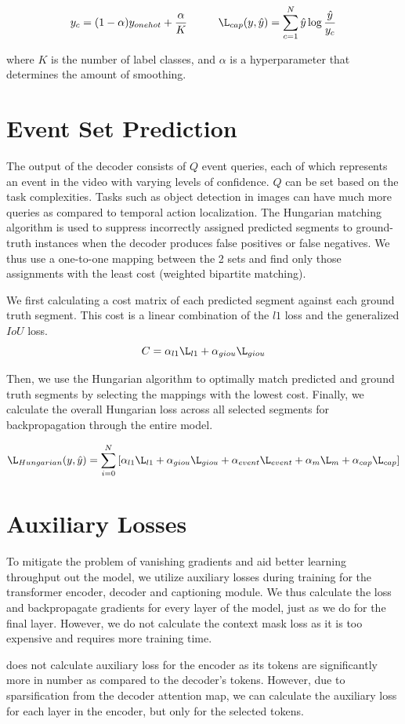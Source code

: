 $$y _{c}= (1 - \alpha)y_{onehot} + \frac{\alpha}{K} \hspace{1cm} \L_{cap}(y, \hat{y}) = \sum_{c=1}^{N}\hat{y} \log{\frac{\hat{y}}{y_c}}$$

\par where $K$ is the number of label classes, and $\alpha$ is a hyperparameter that determines the amount of smoothing.

\section{Event Set Prediction}
\par The output of the decoder consists of $Q$ event queries, each of which represents an event in the video with varying levels of confidence. $Q$ can be set based on the task complexities. Tasks such as object detection in images can have much more queries as compared to temporal action localization. The Hungarian matching algorithm \cite{hungarian} is used to suppress incorrectly assigned predicted segments to ground-truth instances when the decoder produces false positives or false negatives. We thus use a one-to-one mapping between the 2 sets and find only those assignments with the least cost (weighted bipartite matching).
\par We first calculating a cost matrix of each predicted segment against each ground truth segment. This cost is a linear combination of the $l1$ loss and the generalized $IoU$ loss.
$$ C = \alpha_{l1}\L_{l1}  + \alpha_{giou}\L_{giou}$$
\par Then, we use the Hungarian algorithm to optimally match predicted and ground truth segments by selecting the mappings with the lowest cost. Finally, we calculate the overall Hungarian loss across all selected segments for backpropagation through the entire model.

$$\L_{Hungarian}(y, \hat{y}) = \sum_{i=0}^{N}\left [ \alpha_{l1}\L_{l1} + \alpha_{giou}\L_{giou} + \alpha_{event}\L_{event} + \alpha_{m}\L_{m} + \alpha_{cap}\L_{cap} \right ]$$

\section{Auxiliary Losses} \label{chapter:aux}
\par To mitigate the problem of vanishing gradients and aid better learning throughput out the model, we utilize auxiliary losses during training for the transformer encoder, decoder and captioning module. We thus calculate the loss and backpropagate gradients for every layer of the model, just as we do for the final layer. However, we do not calculate the context mask loss as it is too expensive and requires more training time.
\par \cite{carion2020detr} does not calculate auxiliary loss for the encoder as its tokens are significantly more in number as compared to the decoder's tokens. However, due to sparsification from the decoder attention map, we can calculate the auxiliary loss for each layer in the encoder, but only for the selected tokens. 

